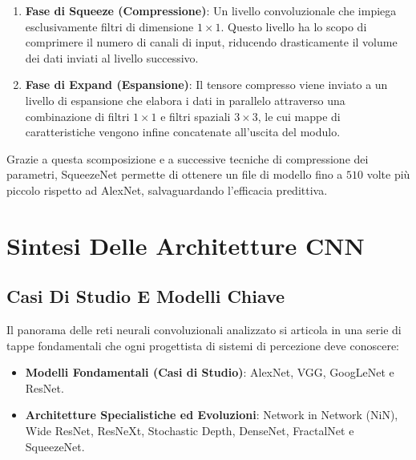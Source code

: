 ﻿\documentclass[11pt, a4paper]{article}
\begin{document}
\begin{enumerate}
    \item \textbf{Fase di Squeeze (Compressione)}: Un livello convoluzionale che impiega esclusivamente filtri di dimensione $1 \times 1$. Questo livello ha lo scopo di comprimere il numero di canali di input, riducendo drasticamente il volume dei dati inviati al livello successivo.
    \item \textbf{Fase di Expand (Espansione)}: Il tensore compresso viene inviato a un livello di espansione che elabora i dati in parallelo attraverso una combinazione di filtri $1 \times 1$ e filtri spaziali $3 \times 3$, le cui mappe di caratteristiche vengono infine concatenate all'uscita del modulo.
\end{enumerate}

Grazie a questa scomposizione e a successive tecniche di compressione dei parametri, SqueezeNet permette di ottenere un file di modello fino a $510$ volte più piccolo rispetto ad AlexNet, salvaguardando l'efficacia predittiva.


\newpage

\section{Sintesi Delle Architetture CNN}

\subsection{Casi Di Studio E Modelli Chiave}

Il panorama delle reti neurali convoluzionali analizzato si articola in una serie di tappe fondamentali che ogni progettista di sistemi di percezione deve conoscere:

\begin{itemize}
    \item \textbf{Modelli Fondamentali (Casi di Studio)}: AlexNet, VGG, GoogLeNet e ResNet.
    \item \textbf{Architetture Specialistiche ed Evoluzioni}: Network in Network (NiN), Wide ResNet, ResNeXt, Stochastic Depth, DenseNet, FractalNet e SqueezeNet.
\end{itemize}

\end{document}
